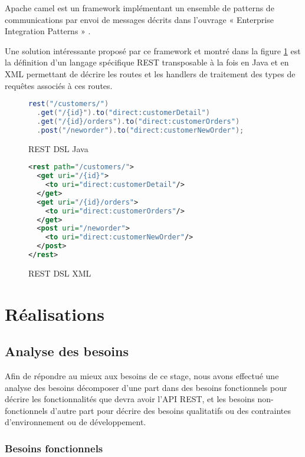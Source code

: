\documentclass[a4paper, 11pt]{report}
\begin{document}
Apache camel est un framework implémentant un ensemble de patterns de
communications par envoi de messages décrits dans l'ouvrage «
Enterprise Integration Patterns » \cite{hohpe2003enterprise}.

Une solution intéressante proposé par ce framework et montré dans la
figure \ref{fig:restdsl} est la définition d'un langage spécifique REST
transposable à la fois en Java et en XML permettant de décrire les
routes et les handlers de traitement des types de requêtes associés à
ces routes.

\begin{figure}
  \ContinuedFloat*
  \begin{lstlisting}[language=java]
rest("/customers/")
  .get("/{id}").to("direct:customerDetail")
  .get("/{id}/orders").to("direct:customerOrders")
  .post("/neworder").to("direct:customerNewOrder");
  \end{lstlisting}
  \caption{REST DSL Java}
\end{figure}

\begin{figure}
  \ContinuedFloat
  \begin{lstlisting}[language=xml]
<rest path="/customers/">
  <get uri="/{id}">
    <to uri="direct:customerDetail"/>
  </get>
  <get uri="/{id}/orders">
    <to uri="direct:customerOrders"/>
  </get>
  <post uri="/neworder">
    <to uri="direct:customerNewOrder"/>
  </post>
</rest>
  \end{lstlisting}
  \caption{REST DSL XML}
  \label{fig:restdsl}
\end{figure}

\chapter{Réalisations}

\section{Analyse des besoins}

Afin de répondre au mieux aux besoins de ce stage, nous avons effectué
une analyse des besoins décomposer d'une part dans des besoins
fonctionnels pour décrire les fonctionnalités que devra avoir l'API
REST, et les besoins non-fonctionnels d'autre part pour décrire des
besoins qualitatifs ou des contraintes d'environnement ou de
développement.

\subsection{Besoins fonctionnels}
\end{document}
